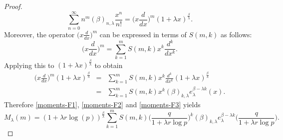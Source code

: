 \documentclass{birkjour}
\theoremstyle{definition}
\theoremstyle{remark}
\numberwithin{equation}{section}
\begin{document}
\begin{proof}
\begin{equation}
\displaystyle{\sum^{\infty}_{n=0}n^{m}(\beta)_{n,
\lambda}\frac{x^{n}}{n!}=\Big(x\frac{d}{dx}\Big)^{m}(1+\lambda
x)^{\frac{\beta}{\lambda}}}.
\end{equation}
Moreover, the operator $\displaystyle{\Big(x\frac{d}{dx}\Big)^{m}}$
can be expressed in terms of $S(m, k)$ as follows:
$$\displaystyle{\Big(x\frac{d}{dx}\Big)^{m}=\sum^{m}_{k=1}S(m, k)x^{k}\frac{d^{k}}{dx^{k}}}.$$
Applying this to $\displaystyle{(1+\lambda
x)^{\frac{\beta}{\lambda}}}$ to obtain
\begin{eqnarray}\label{moments-F3}
\displaystyle{\Big(x\frac{d}{dx}\Big)^{m}(1+\lambda
x)^{\frac{\beta}{\lambda}}}&=&\displaystyle{\sum^{m}_{k=1}S(m,
k)x^{k}\frac{d^{k}}{dx^{k}}(1+\lambda x)^{\frac{\beta}{\lambda}}}\nonumber\\
&=&\displaystyle{\sum^{m}_{k=1}S(m, k)x^{k}(\beta)_{k,
\lambda}e^{\beta-\lambda k}_{\lambda}(x)}.
\end{eqnarray}
Therefore \eqref{moments-F1}, \eqref{moments-F2} and
\eqref{moments-F3} yields
$$M_{\lambda}(m)=\displaystyle{(1+\lambda r\log(p))^{\frac{\beta}{\lambda}}
\sum^{m}_{k=1}S(m, k)\Big(\frac{q}{1+\lambda r\log
p}\Big)^{k}(\beta)_{k, \lambda}e^{\beta-\lambda
k}_{\lambda}\Big(\frac{q}{1+\lambda r\log p}\Big)}.$$
\end{proof}
\end{document}
